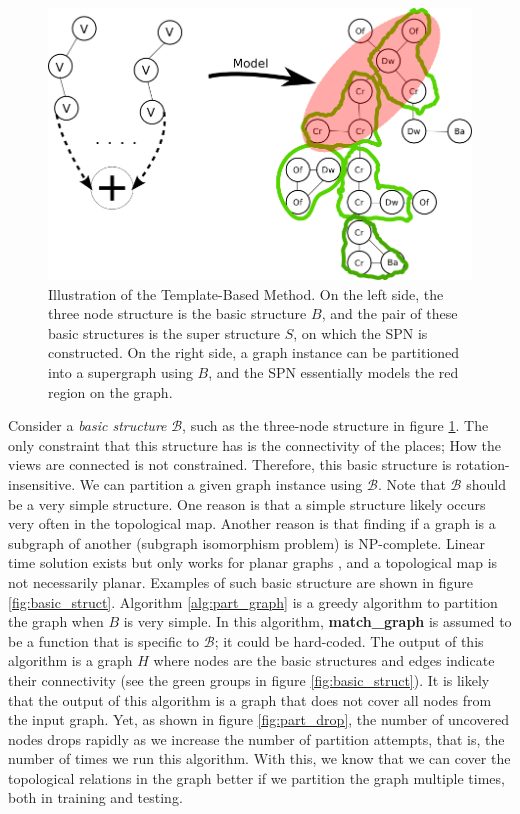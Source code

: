 \documentclass[10pt, titlepage]{article}
\theoremstyle{definition}
\begin{document}
\begin{figure}[!htb]
    \centering
    \captionsetup{width=.8\linewidth}
    \includegraphics[scale=0.4]{images/big_graph.png}
    \caption{Illustration of the Template-Based Method. On the left side, the three node structure is the basic structure $B$, and the pair of these basic structures is the super structure $S$, on which the SPN is constructed. On the right side, a graph instance can be partitioned into a supergraph using $B$, and the SPN essentially models the red region on the graph.}
    \label{fig:tmpmod}
\end{figure}

Consider a \textit{basic structure} $\mathcal{B}$, such as the three-node structure in figure \ref{fig:tmpmod}. The only constraint that this structure has is the connectivity of the places; How the views are connected is not constrained. Therefore, this basic structure is rotation-insensitive. We can partition a given graph instance using $\mathcal{B}$. Note that $\mathcal{B}$ should be a very simple structure. One reason is that a simple structure likely occurs very often in the topological map. Another reason is that finding if a graph is a subgraph of another (subgraph isomorphism problem) is NP-complete. Linear time solution exists but only works for planar graphs \cite{eppstein1995subgraph}, and a topological map is not necessarily planar. Examples of such basic structure are shown in figure \ref{fig:basic_struct}. Algorithm \ref{alg:part_graph} is a greedy algorithm to partition the graph when $B$ is very simple. In this algorithm, \textbf{match\_graph} is assumed to be a function that is specific to $\mathcal{B}$; it could be hard-coded. The output of this algorithm is a graph $H$ where nodes are the basic structures and edges indicate their connectivity (see the green groups in figure \ref{fig:basic_struct}). It is likely that the output of this algorithm is a graph that does not cover all nodes from the input graph. Yet, as shown in figure \ref{fig:part_drop}, the number of uncovered nodes drops rapidly as we increase the number of partition attempts, that is, the number of times we run this algorithm. With this, we know that we can cover the topological relations in the graph better if we partition the graph multiple times, both in training and testing.
\end{document}
